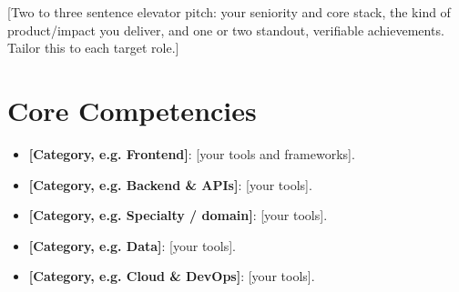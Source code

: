 \documentclass[11pt,a4paper,sans]{moderncv}
\begin{document}
\makecvtitle


\vspace{6pt}
\small{[Two to three sentence elevator pitch: your seniority and core stack, the kind of
product/impact you deliver, and one or two standout, verifiable achievements. Tailor this
to each target role.]}


\section{Core Competencies}
\vspace{1pt}
\begin{itemize}
\item \textbf{[Category, e.g. Frontend]}: [your tools and frameworks].
\item \textbf{[Category, e.g. Backend \& APIs]}: [your tools].
\item \textbf{[Category, e.g. Specialty / domain]}: [your tools].
\item \textbf{[Category, e.g. Data]}: [your tools].
\item \textbf{[Category, e.g. Cloud \& DevOps]}: [your tools].
\end{itemize}

\end{document}

